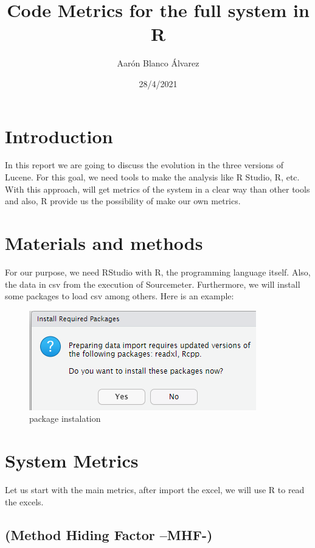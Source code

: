 \documentclass[
]{article}
\title{Code Metrics for the full system in R}
\author{Aarón Blanco Álvarez}
\date{28/4/2021}
\begin{document}
\maketitle

\hypertarget{introduction}{%
\section{Introduction}\label{introduction}}

In this report we are going to discuss the evolution in the three
versions of Lucene. For this goal, we need tools to make the analysis
like R Studio, R, etc. With this approach, will get metrics of the
system in a clear way than other tools and also, R provide us the
possibility of make our own metrics.

\hypertarget{materials-and-methods}{%
\section{Materials and methods}\label{materials-and-methods}}

For our purpose, we need RStudio with R, the programming language
itself. Also, the data in csv from the execution of Sourcemeter.
Furthermore, we will install some packages to load csv among others.
Here is an example:

\begin{figure}
\centering
\includegraphics{EXCEL.png}
\caption{package instalation}
\end{figure}

\hypertarget{system-metrics}{%
\section{System Metrics}\label{system-metrics}}

Let us start with the main metrics, after import the excel, we will use
R to read the excels.

\hypertarget{method-hiding-factor-mhf-}{%
\subsection{(Method Hiding Factor
--MHF-)}\label{method-hiding-factor-mhf-}}
\end{document}
